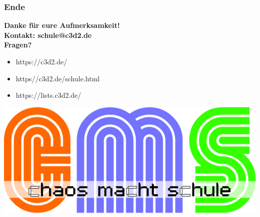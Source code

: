 \documentclass[12pt, table]{beamer}
\begin{document}
\begin{frame}
	\frametitle{Ende}
	\begin{center}
		\textbf{Danke für eure Aufmerksamkeit!} \\
		\textbf{Kontakt: schule@c3d2.de} \\
		\textbf{Fragen?} 
	\end{center}
	\begin{itemize}
		\item<1-> https://c3d2.de/
		\item<2-> https//c3d2.de/schule.html
		\item<4-> https://lists.c3d2.de/  
	\end{itemize}
\end{frame}

\begin{frame}
	\begin{center}
    	\includegraphics[height=0.5\textheight]{../img/cms-text.png}
    \end{center}
\end{frame}
\end{document}
